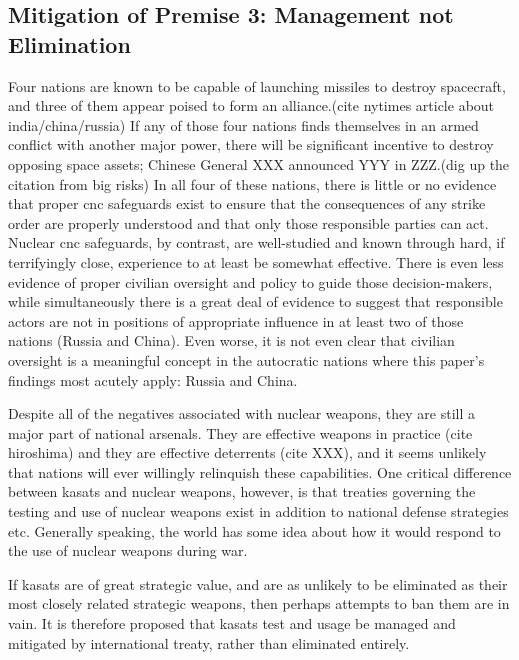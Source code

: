 \subsection{Mitigation of Premise 3: Management not Elimination}
Four nations are known to be capable of launching missiles to destroy
spacecraft, and three of them appear poised to form an alliance.(cite
nytimes article about india/china/russia) If any of those four nations
finds themselves in an armed conflict with another major power, there
will be significant incentive to destroy opposing space assets;
Chinese General XXX announced YYY in ZZZ.(dig up the citation from big
risks) In all four of these nations, there is little or no evidence
that proper \ac{cnc} safeguards exist to ensure that the consequences
of any strike order are properly understood and that only those
responsible parties can act.  Nuclear \ac{cnc} safeguards, by
contrast, are well-studied and known through hard, if terrifyingly
close, experience to at least be somewhat effective.\cite[ask foster
  for a recommendation]{xxx} There is even less evidence of proper
civilian oversight and policy to guide those decision-makers, while
simultaneously there is a great deal of evidence to suggest that
responsible actors are not in positions of appropriate influence in at
least two of those nations (Russia and China).  Even worse, it is not
even clear that civilian oversight is a meaningful concept in the
autocratic nations where this paper's findings most acutely apply:
Russia and China.\cite{dictator}

Despite all of the negatives associated with nuclear weapons, they are
still a major part of national arsenals.  They are effective weapons
in practice (cite hiroshima) and they are effective deterrents (cite
XXX), and it seems unlikely that nations will ever willingly
relinquish these capabilities.  One critical difference between
\acp{kasat} and nuclear weapons, however, is that treaties governing
the testing and use of nuclear weapons exist in addition to national
defense strategies etc.  Generally speaking, the world has some idea
about how it would respond to the use of nuclear weapons during war.
\cite[biden's statement]{xxx}

If \acp{kasat} are of great strategic value, and are as unlikely to be
eliminated as their most closely related strategic weapons, then
perhaps attempts to ban them are in vain.  It is therefore proposed
that \acp{kasat} test and usage be managed and mitigated by
international treaty, rather than eliminated entirely.

